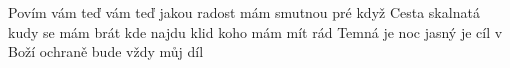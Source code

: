 \begin{TEXT}{Povím vám teď}
\SLOKA {} vám teď jakou radost mám \NL
smutnou pré  když    
\SLOKA Cesta skalnatá kudy se mám brát \NL
kde najdu klid koho mám mít rád 
\SLOKA Temná je noc jasný je cíl \NL
v Boží ochraně bude vždy můj díl 
\end{TEXT}
